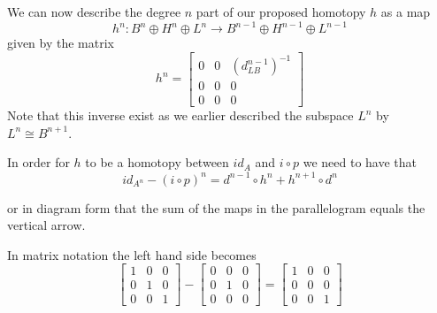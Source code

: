 We can now describe the degree $n$ part of our proposed homotopy $h$ as a map 
\begin{equation*}
    h^n\colon B^n\oplus H^n\oplus L^n \longrightarrow B^{n-1}\oplus H^{n-1}\oplus L^{n-1} 
\end{equation*}
given by the matrix 
\begin{equation*}
h^n = 
\begin{bmatrix}
0 & 0 & (d_{LB}^{n-1})^{-1}\\
0 & 0 & 0\\
0 & 0 & 0
\end{bmatrix}
\end{equation*}
Note that this inverse exist as we earlier described the subspace $L^n$ by $L^n \cong B^{n+1}$. 

In order for $h$ to be a homotopy between $id_A$ and $i\circ p$ we need to have that 
\begin{equation*}
    id_{A^n} - (i\circ p)^n = d^{n-1}\circ h^{n} + h^{n+1}\circ d^n 
\end{equation*}

or in diagram form that the sum of the maps in the parallelogram equals the vertical arrow. 
\begin{center}
\end{center}

In matrix notation the left hand side becomes
\begin{equation*}
\begin{bmatrix}
1 & 0 & 0 \\
0 & 1 & 0 \\
0 & 0 & 1
\end{bmatrix}
-
\begin{bmatrix}
0 & 0 & 0 \\
0 & 1 & 0 \\
0 & 0 & 0
\end{bmatrix}
=
\begin{bmatrix}
1 & 0 & 0 \\
0 & 0 & 0 \\
0 & 0 & 1
\end{bmatrix}
\end{equation*}

